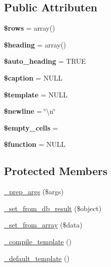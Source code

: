\subsection*{Public Attributen}
\begin{DoxyCompactItemize}
\item 
\mbox{\label{class_c_i___table_ace2ec39e7df3899fa8df9640ec274b03}} 
{\bfseries \$rows} = array()
\item 
\mbox{\label{class_c_i___table_a196169be7715d466e3310388b096598c}} 
{\bfseries \$heading} = array()
\item 
\mbox{\label{class_c_i___table_a394ea4ec17bcd63228039d7767bfb092}} 
{\bfseries \$auto\+\_\+heading} = T\+R\+UE
\item 
\mbox{\label{class_c_i___table_a4f9340ccb02c5d876a448a1d860f3812}} 
{\bfseries \$caption} = N\+U\+LL
\item 
\mbox{\label{class_c_i___table_aa3e9534005fd516d941f6a5569896e01}} 
{\bfseries \$template} = N\+U\+LL
\item 
\mbox{\label{class_c_i___table_a8735d5c31c4af1004825e6a28f236aeb}} 
{\bfseries \$newline} = \char`\"{}\textbackslash{}n\char`\"{}
\item 
\mbox{\label{class_c_i___table_aeba996c863f9ba0e2c9e24d0491bb976}} 
{\bfseries \$empty\+\_\+cells} = \textquotesingle{}\textquotesingle{}
\item 
\mbox{\label{class_c_i___table_af3e5d0d1ff43879d493dd97bb760c479}} 
{\bfseries \$function} = N\+U\+LL
\end{DoxyCompactItemize}
\subsection*{Protected Members}
\begin{DoxyCompactItemize}
\item 
\mbox{\hyperlink{class_c_i___table_aec91c20b757a8a063e4147f0aebe8b1b}{\+\_\+prep\+\_\+args}} (\$args)
\item 
\mbox{\hyperlink{class_c_i___table_a76d76f4f5ffe03c119b95164dcebf9ed}{\+\_\+set\+\_\+from\+\_\+db\+\_\+result}} (\$object)
\item 
\mbox{\hyperlink{class_c_i___table_a79c6ca8fd1f4e5b4bee157209e866a02}{\+\_\+set\+\_\+from\+\_\+array}} (\$data)
\item 
\mbox{\hyperlink{class_c_i___table_a7f408fd4eecadb5799d5ae004170c4d6}{\+\_\+compile\+\_\+template}} ()
\item 
\mbox{\hyperlink{class_c_i___table_ae1990fcb9ffc455614eeac9a1091f0b0}{\+\_\+default\+\_\+template}} ()
\end{DoxyCompactItemize}


